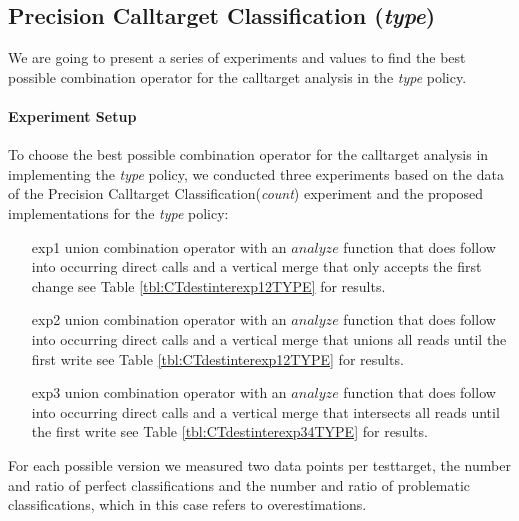 %
%


\newpage
\subsection{Precision Calltarget Classification (\textit{type})}
\label{subsection:typeshieldprecision}
We are going to present a series of experiments and values to find the best possible combination operator for the calltarget analysis in the \textit{type} policy.
\paragraph{Experiment Setup}
To choose the best possible combination operator for the calltarget analysis in implementing the \textit{type} policy, we conducted three experiments based on the data of the Precision Calltarget Classification(\textit{count}) experiment and the proposed implementations for the \textit{type} policy:
\begin{enumerate}
\item[exp1] union combination operator with an $analyze$ function that does follow into occurring direct calls and a vertical merge that only accepts the first change see Table \ref{tbl:CTdestinterexp12TYPE} for results.
\item[exp2] union combination operator with an $analyze$ function that does follow into occurring direct calls  and a vertical merge that unions all reads until the first write see Table \ref{tbl:CTdestinterexp12TYPE} for results.
\item[exp3] union combination operator with an $analyze$ function that does follow into occurring direct calls  and a vertical merge that intersects all reads until the first write see Table \ref{tbl:CTdestinterexp34TYPE} for results.
\end{enumerate}
For each possible version we measured two data points per testtarget, the number and ratio of perfect classifications and the number and ratio of problematic classifications, which in this case refers to overestimations.
